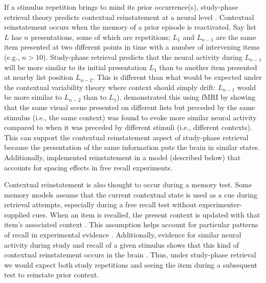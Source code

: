 
If a stimulus repetition brings to mind its prior occurrence(s), study-phase retrieval theory predicts contextual reinstatement at a neural level \cite{HowaKaha2002}.  Contextual reinstatement occurs when the memory of a prior episode is reactivated.  Say list $L$ has $n$ presentations, some of which are repetitions; $L_{1}$ and $L_{n-1}$ are the same item presented at two different points in time with a number of intervening items (e.g., $n>10$).  Study-phase retrieval predicts that the neural activity during $L_{n-1}$ will be more similar to its initial presentation $L_{1}$ than to another item presented at nearby list position $L_{n-2}$.  This is different than what would be expected under the contextual variability theory where context should simply drift: $L_{n-1}$ would be more similar to $L_{n-2}$ than to $L_{1}$).   demonstrated this using fMRI by showing that the same visual scene presented on different lists but preceded by the same stimulus (i.e., the same context) was found to evoke more similar neural activity compared to when it was preceded by different stimuli (i.e., different contexts).  This can support the contextual reinstatement aspect of study-phase retrieval because the presentation of the same information puts the brain in similar states.  Additionally,  implemented reinstatement in a model (described below) that accounts for spacing effects in free recall experiments.


Contextual reinstatement is also thought to occur during a memory test.  Some memory models assume that the current contextual state is used as a cue during retrieval attempts, especially during a free recall test without experimenter-supplied cues.  When an item is recalled, the present context is updated with that item's associated context \cite{HowaKaha2002,SedeEtal2008}.  This assumption helps account for particular patterns of recall in experimental evidence \cite{Kaha1996,LohnKaha2014b}.
Additionally, evidence for similar neural activity during study and recall of a given stimulus shows that this kind of contextual reinstatement occurs in the brain \cite{MannEtal2011,PolyKaha2008,XueEtal2010}.
Thus, under study-phase retrieval we would expect both study repetitions and seeing the item during a subsequent test to reinstate prior context.

